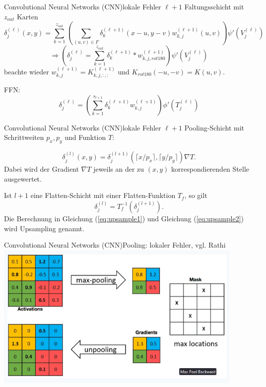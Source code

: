 \documentclass[10pt]{beamer} %
\begin{document}
\begin{frame}{Convolutional Neural Networks (CNN)}{lokale Fehler}
   \pause
   $\ell+1$ Faltungsschicht mit $z_{out}$ Karten
   \begin{equation*}
      \delta_j^{(\ell)}(x,y)=\sum_{k=1}^{z_{out}} \left(\sum_{(u,v) \in F} \delta_k^{(\ell+1)}(x-u,y-v) w_{k,j}^{(\ell+1)}(u,v)\right) \psi'(V_j^{(\ell)})
   \end{equation*}
   \begin{equation*}
      \Rightarrow \left( \delta_j^{(\ell)}= \sum_{k=1}^{z_{out}} \delta_k^{(\ell+1)} \ast w_{k,j,rot180}^{(\ell+1)} \right) \psi'(V_j^{(\ell)})
  \end{equation*}
  beachte wieder $w_{k,j}^{(\ell+1)}=K^{(\ell+1)}_{k,j,:,:}$ und $K_{rot180}(-u,-v)=K(u,v)$.
  \pause
  
  FFN:
  \begin{equation*}
   \delta_j^{(\ell)}=\left(\sum_{k=1}^{s_{l+1}} \delta^{(\ell+1)}_k w^{(\ell+1)}_{k,j}\right) \phi'(T_j^{(\ell)})
\end{equation*}
\end{frame}

\begin{frame}{Convolutional Neural Networks (CNN)}{lokale Fehler}
   \pause
   $\ell+1$ Pooling-Schicht mit Schrittweiten $p_x,p_y$ und Funktion $T$:

   \begin{equation}
      \label{eq:upsample1}
      \delta_j^{(l)}(x,y)=\delta_j^{(l+1)}(\lceil x/p_x \rceil ,\lceil y/p_y \rceil)\nabla T.
  \end{equation}
  Dabei wird der Gradient $\nabla T$ jeweils an der zu $(x,y)$ korrespondierenden Stelle ausgewertet.
  \pause

  Ist $l+1$ eine Flatten-Schicht mit einer Flatten-Funktion $T_f$, so gilt
\begin{equation}
    \label{eq:upsample2}
    \delta_j^{(l)}=T^{-1}_f(\delta_j^{(l+1)}).
\end{equation}
Die Berechnung in Gleichung (\ref{eq:upsample1}) und Gleichung (\ref{eq:upsample2}) wird Upsampling genannt.
\end{frame}

\begin{frame}{Convolutional Neural Networks (CNN)}{Pooling: lokaler Fehler, vgl. Rathi\cite{rathi}}
   \includegraphics[width=0.9\textwidth]{pics/maxpoolback.png}
\end{frame}
\end{document}
